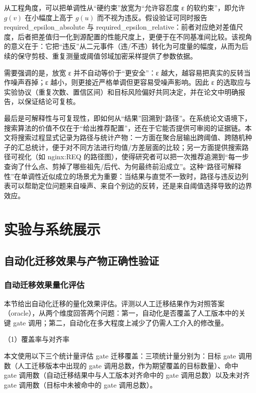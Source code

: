 \documentclass[UTF8,a4paper,12pt,twoside]{ctexart}  %
\begin{document}
从工程角度，可以把单调性从``硬约束''放宽为``允许容忍度 ε
的软约束''，即允许 \(g(v)\) 在小幅度上高于 \(g(u)\)
而不视为违反。假设验证可同时报告 required\_epsilon\_absolute 与
required\_epsilon\_relative：前者对应绝对差值尺度，后者把差值归一化到源配置的性能尺度上，更便于在不同基准间比较。该视角的意义在于：它把``违反''从二元事件（违/不违）转化为可度量的幅度，从而为后续的保守剪枝、重复测量或阈值邻域加密采样提供了参数依据。

需要强调的是，放宽 ε 并不自动等价于``更安全''：ε
越大，越容易把真实的反转当作噪声吞掉；ε
越小，则更接近严格单调但更容易受噪声影响。因此 ε
的选取应与实验协议（重复次数、置信区间）和目标风险偏好共同决定，并在论文中明确报告，以保证结论可复核。

最后是可解释性与可复现性，即如何从``结果''回溯到``路径''。在系统论文语境下，搜索算法的价值不仅在于``给出推荐配置''，还在于它能否提供可审阅的证据链。本文将搜索过程显式记录为路径与统计产物：一方面在聚合层输出跨阈值、跨随机种子的汇总统计，便于对不同方法进行均值/方差层面的比较；另一方面提供搜索路径可视化（如
nginx:REQ
的路径图），使得研究者可以把一次推荐追溯到``每一步查询了什么点、剪掉了哪些祖先/后代、为何最终前沿成立''。这种``路径可解释性''在单调性近似成立的场景尤为重要：当结果与直觉不一致时，路径与违反边列表可以帮助定位问题来自噪声、来自个别边的反转，还是来自阈值选择导致的边界效应。

\cleardoublepage
\section{实验与系统展示}

\subsection{自动化迁移效果与产物正确性验证}


\subsubsection{自动迁移效果量化评估}
本节给出自动化迁移的量化效果评估。评测以人工迁移结果作为对照答案（oracle），从两个维度回答两个问题：第一，自动化是否覆盖了人工版本中的关键
gate 调用；第二，自动化在多大程度上减少了仍需人工介入的修改量。

（1）覆盖率与对齐率

本文使用以下三个统计量评估 gate 迁移覆盖：三项统计量分别为：目标 gate 调用数（人工迁移版本中出现的 gate
调用总数，作为期望覆盖的目标数量）、命中 gate
调用数（自动迁移结果中与人工版本对齐命中的 gate 调用总数）以及未对齐
gate 调用数（目标中未被命中的 gate 调用总数）。
\end{document}
